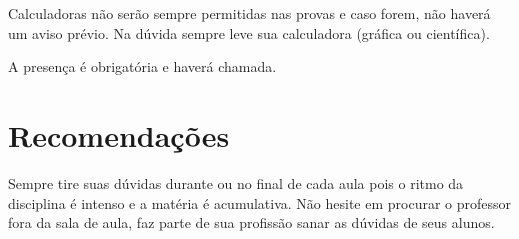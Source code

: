 \begin{itemize}
 Calculadoras não serão sempre permitidas nas provas e caso forem, não haverá um aviso prévio. Na dúvida sempre leve sua calculadora (gráfica ou científica).

 A presença é obrigatória e haverá chamada.

 \section*{Recomendações}
 Sempre tire suas dúvidas durante ou no final de cada aula pois o ritmo da disciplina é intenso e a matéria é acumulativa. Não hesite em 
 procurar o professor fora da sala de aula, faz  parte de sua profissão sanar as dúvidas de seus alunos.
\end{itemize}
